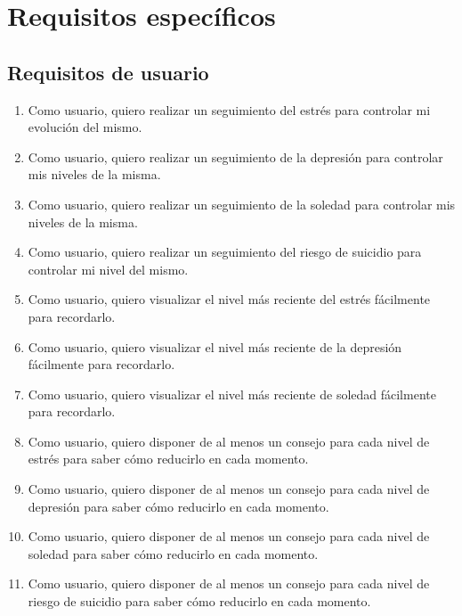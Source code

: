 \section{Requisitos específicos}
    \label{req:especificos}
    
    \subsection{Requisitos de usuario}
        \label{req:especificos:usuarios}


        \begin{enumerate}[label=\textbf{\texttt{RU-\arabic*}}]
            \item Como usuario, quiero realizar un seguimiento del estrés para controlar mi evolución del mismo.
            \item Como usuario, quiero realizar un seguimiento de la depresión para controlar mis niveles de la misma.
            \item Como usuario, quiero realizar un seguimiento de la soledad para controlar mis niveles de la misma.
            \item Como usuario, quiero realizar un seguimiento del riesgo de suicidio para controlar mi nivel del mismo.
            \item Como usuario, quiero visualizar el nivel más reciente del estrés fácilmente para recordarlo.
            \item Como usuario, quiero visualizar el nivel más reciente de la depresión fácilmente para recordarlo.
            \item Como usuario, quiero visualizar el nivel más reciente de soledad fácilmente para recordarlo.
            \item Como usuario, quiero disponer de al menos un consejo para cada nivel de estrés para saber cómo reducirlo en cada momento.
            \item Como usuario, quiero disponer de al menos un consejo para cada nivel de depresión para saber cómo reducirlo en cada momento.
            \item Como usuario, quiero disponer de al menos un consejo para cada nivel de soledad para saber cómo reducirlo en cada momento.
            \item Como usuario, quiero disponer de al menos un consejo para cada nivel de riesgo de suicidio para saber cómo reducirlo en cada momento.

\end{enumerate}
